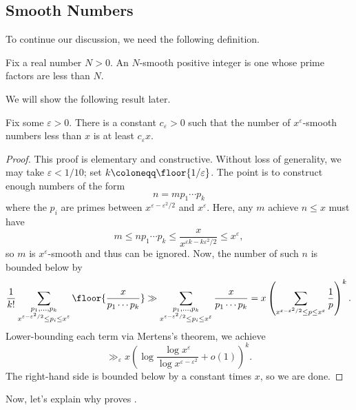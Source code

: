 \documentclass[../notes.tex]{subfiles}
\begin{document}
\subsection{Smooth Numbers}
To continue our discussion, we need the following definition.
\begin{definition}[smooth]
	Fix a real number $N>0$. An $N$-smooth positive integer is one whose prime factors are less than $N$.
\end{definition}
We will show the following result later.
\begin{lemma} \label{lem:smooth}
	Fix some $\varepsilon>0$. There is a constant $c_\varepsilon>0$ such that the number of $x^\varepsilon$-smooth numbers less than $x$ is at least $c_\varepsilon x$.
\end{lemma}
\begin{proof}
	This proof is elementary and constructive. Without loss of generality, we may take $\varepsilon<1/10$; set $k\coloneqq\floor{1/\varepsilon}$. The point is to construct enough numbers of the form
	\[n=mp_1\cdots p_k\]
	where the $p_i$ are primes between $x^{\varepsilon-\varepsilon^2/2}$ and $x^\varepsilon$. Here, any $m$ achieve $n\le x$ must have
	\[m\le n{p_1\cdots p_k}\le\frac{x}{x^{\varepsilon k-k\varepsilon^2/2}}\le x^\varepsilon,\]
	so $m$ is $x^\varepsilon$-smooth and thus can be ignored. Now, the number of such $n$ is bounded below by
	\[\frac1{k!}\sum_{\substack{p_1,\ldots,p_k\\x^{\varepsilon-\varepsilon^2/2}\le p_i\le x^\varepsilon}}\floor{\frac x{p_1\cdots p_k}}\gg\sum_{\substack{p_1,\ldots,p_k\\x^{\varepsilon-\varepsilon^2/2}\le p_i\le x^\varepsilon}}\frac x{p_1\cdots p_k}=x\left(\sum_{x^{\varepsilon-\varepsilon^2/2}\le p\le x^\varepsilon}\frac1p\right)^k.\]
	Lower-bounding each term via Mertens's theorem, we achieve
	\[\gg_\varepsilon x\left(\log\frac{\log x^\varepsilon}{\log x^{\varepsilon-\varepsilon^2}}+o(1)\right)^k.\]
	The right-hand side is bounded below by a constant times $x$, so we are done.
\end{proof}
Now, let's explain why  proves .
\linnikthm*
\end{document}
